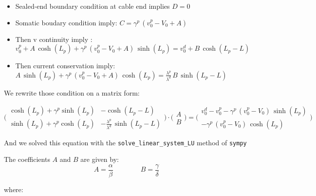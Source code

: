 \documentclass[colorlinks]{article}
\begin{document}
\begin{itemize}
\item Sealed-end boundary condition at cable end implies $D=0$

\item Somatic boudary condition imply: $C = \gamma^p \, (v_0^p - V_0 + A)$

\item Then v continuity imply :
\( v_0^p + A \, \cosh(L_p) +  \gamma^p \, (v_0^p - V_0 + A) \, \sinh(L_p) = v_0^d + B \, \cosh(L_p-L) \)

\item Then current conservation imply: 
\( A \, \sinh(L_p) +  \gamma^p \, (v_0^p - V_0 + A) \, \cosh(L_p) = \frac{\lambda^p}{\lambda^d} \, B \, \sinh(L_p-L) \)
\end{itemize}

We rewrite those condition on a matrix form:

\begin{equation}
\Big(
\begin{matrix}
    \cosh(L_p)+\gamma^p \sinh(L_p) & -\cosh(L_p-L) \\
    \sinh(L_p)+\gamma^p \cosh(L_p) & -  \frac{\lambda^p}{\lambda^d} \, \sinh(L_p-L) 
\end{matrix}
\Big)
\cdot
\Big(
\begin{matrix}
    A \\
    B 
\end{matrix}
\Big) = 
\Big(
\begin{matrix}
v_0^d - v_0^p - \gamma^p \, (v_0^p-V_0) \, \sinh(L_p) \\
- \gamma^p \, (v_0^p-V_0) \, \cosh(L_p)
\end{matrix}
\Big)
\end{equation}

And we solved this equation with the \texttt{solve\_linear\_system\_LU} method of \texttt{sympy}

The coefficients $A$ and $B$ are given by:
\begin{equation}
A=\frac{\alpha}{\beta} \qquad \qquad B=\frac{\gamma}{\delta}
\end{equation}

where:
\end{document}
